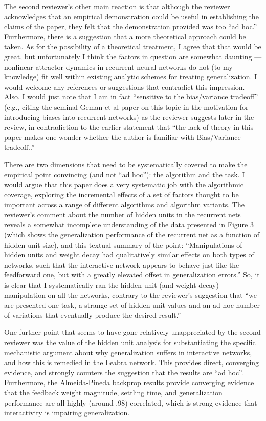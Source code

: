 \documentclass [11pt]{letter}
\begin{document}
\begin{letter}
The second reviewer's other main reaction is that although the
reviewer acknowledges that an empirical demonstration could be useful
in establishing the claims of the paper, they felt that the
demonstration provided was too ``ad hoc.''  Furthermore, there is a
suggestion that a more theoretical approach could be taken.  As for
the possibility of a theoretical treatment, I agree that that would be
great, but unfortunately I think the factors in question are somewhat
daunting --- nonlinear attractor dynamics in recurrent neural networks
do not (to my knowledge) fit well within existing analytic schemes for
treating generalization.  I would welcome any references or
suggestions that contradict this impression.  Also, I would just note
that I am in fact ``sensitive to the bias/variance tradeoff'' (e.g.,
citing the seminal Geman et al paper on this topic in the motivation
for introducing biases into recurrent networks) as the reviewer
suggests later in the review, in contradiction to the earlier
statement that ``the lack of theory in this paper makes one wonder
whether the author is familiar with Bias/Variance tradeoff..''

There are two dimensions that need to be systematically covered to
make the empirical point convincing (and not ``ad hoc''): the
algorithm and the task.  I would argue that this paper does a very
systematic job with the algorithmic coverage, exploring the
incremental effects of a set of factors thought to be important across
a range of different algorithms and algorithm variants.  The
reviewer's comment about the number of hidden units in the recurrent
nets reveals a somewhat incomplete understanding of the data presented
in Figure 3 (which shows the generalization performance of the
recurrent net as a function of hidden unit size), and this textual
summary of the point: ``Manipulations of hidden units and weight decay
had qualitatively similar effects on both types of networks, such that
the interactive network appears to behave just like the feedforward
one, but with a greatly elevated offset in generalization errors.''
So, it is clear that I systematically ran the hidden unit (and weight
decay) manipulation on all the networks, contrary to the reviewer's
suggestion that ``we are presented one task, a strange set of hidden
unit values and an ad hoc number of variations that eventually produce
the desired result.''

One further point that seems to have gone relatively unappreciated by
the second reviewer was the value of the hidden unit analysis for
substantiating the specific mechanistic argument about why
generalization suffers in interactive networks, and how this is
remedied in the Leabra network.  This provides direct, converging
evidence, and strongly counters the suggestion that the results are
``ad hoc''.  Furthermore, the Almeida-Pineda backprop results provide
converging evidence that the feedback weight magnitude, settling time,
and generalization performance are all highly (around .98) correlated,
which is strong evidence that interactivity is impairing
generalization. 


\end{letter}
\end{document}
